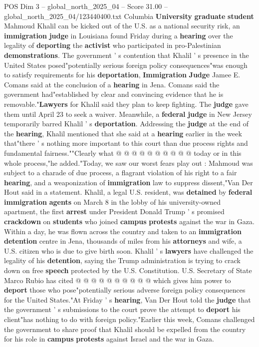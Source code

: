 \begin{textsample}{POS Dim 3 – global\_north\_2025\_04 – Score 31.00 – global\_north\_2025\_04/123440400.txt}  \label{ex:f3_pos_042}
Columbia \textbf{University} \textbf{graduate} \textbf{student} Mahmoud Khalil can be kicked out of the U.S. as a national security risk, an \textbf{immigration} \textbf{judge} in Louisiana found Friday during a \textbf{hearing} over the legality of \textbf{deporting} the \textbf{activist} who participated in pro-Palestinian \textbf{demonstrations}.
The government ' s contention that Khalil ' s presence in the United States posed"potentially serious foreign policy consequences"was enough to satisfy requirements for his \textbf{deportation}, \textbf{Immigration} \textbf{Judge} Jamee E.
Comans said at the conclusion of a \textbf{hearing} in Jena.
Comans said the government had"established by clear and convincing evidence that he is removable."\textbf{Lawyers} for Khalil said they plan to keep fighting.
The \textbf{judge} gave them until April 23 to seek a waiver.
Meanwhile, a \textbf{federal} \textbf{judge} in New Jersey temporarily barred Khalil ' s \textbf{deportation}.
Addressing the \textbf{judge} at the end of the \textbf{hearing}, Khalil mentioned that she said at a \textbf{hearing} earlier in the week that"there ' s nothing more important to this court than due process rights and fundamental fairness.""Clearly what @ @ @ @ @ @ @ @ @ @ today or in this whole process,"he added."Today, we saw our worst fears play out : Mahmoud was subject to a charade of due process, a flagrant violation of his right to a fair \textbf{hearing}, and a weaponization of \textbf{immigration} law to suppress dissent,"Van Der Hout said in a statement.
Khalil, a legal U.S. resident, was \textbf{detained} by \textbf{federal} \textbf{immigration} \textbf{agents} on March 8 in the lobby of his university-owned apartment, the first \textbf{arrest} under President Donald Trump ' s promised \textbf{crackdown} on \textbf{students} who joined \textbf{campus} \textbf{protests} against the war in Gaza.
Within a day, he was flown across the country and taken to an \textbf{immigration} \textbf{detention} centre in Jena, thousands of miles from his \textbf{attorneys} and wife, a U.S. citizen who is due to give birth soon.
Khalil ' s \textbf{lawyers} have challenged the legality of his \textbf{detention}, saying the Trump administration is trying to crack down on free \textbf{speech} protected by the U.S.
Constitution.
U.S.
Secretary of State Marco Rubio has cited @ @ @ @ @ @ @ @ @ @ which gives him power to \textbf{deport} those who pose"potentially serious adverse foreign policy consequences for the United States."At Friday ' s \textbf{hearing}, Van Der Hout told the \textbf{judge} that the government ' s submissions to the court prove the attempt to \textbf{deport} his client"has nothing to do with foreign policy."Earlier this week, Comans challenged the government to share proof that Khalil should be expelled from the country for his role in \textbf{campus} \textbf{protests} against Israel and the war in Gaza.

\end{textsample}
